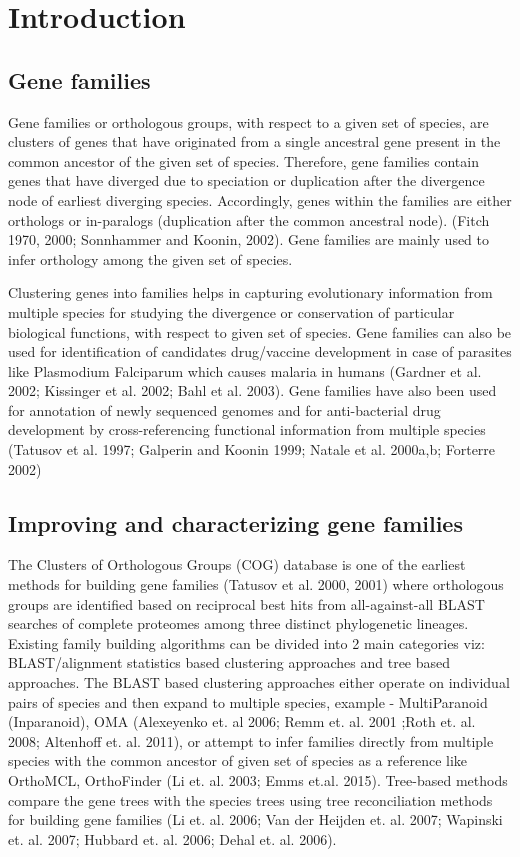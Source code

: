 \documentclass{article}
\begin{document}
	
	\section{Introduction}
		\subsection{Gene families}
		Gene families or orthologous groups, with respect to a given set of species, are clusters of genes that have originated from a single ancestral gene present in the common ancestor of the given set of species. Therefore, gene families contain genes that have diverged due to speciation or duplication after the divergence node of earliest diverging species. Accordingly, genes within the families are either orthologs or in-paralogs (duplication after the common ancestral node). (Fitch 1970, 2000; Sonnhammer and Koonin, 2002). Gene families are mainly used to infer orthology among the given set of species.
		
		Clustering genes into families helps in capturing evolutionary information from multiple species for studying the divergence or conservation of particular biological functions, with respect to given set of species. Gene families can also be used for identification of candidates drug/vaccine development in case of parasites like Plasmodium Falciparum which causes malaria in humans (Gardner et al. 2002; Kissinger et al. 2002; Bahl et al. 2003). Gene families have also been used for annotation of newly sequenced genomes and for anti-bacterial drug development by cross-referencing functional information from multiple species (Tatusov et al. 1997; Galperin and Koonin 1999; Natale et al. 2000a,b; Forterre 2002)
		
		\subsection{Improving and characterizing gene families}
		The Clusters of Orthologous Groups (COG) database is one of the earliest methods for building gene families (Tatusov et al. 2000, 2001) where orthologous groups are identified based on reciprocal best hits from all-against-all BLAST searches of complete proteomes among three distinct phylogenetic lineages. Existing family building algorithms can be divided into 2 main categories viz: BLAST/alignment statistics based clustering approaches and tree based approaches. The BLAST based clustering approaches either operate on individual pairs of species and then expand to multiple species, example - MultiParanoid (Inparanoid), OMA (Alexeyenko et. al 2006; Remm et. al. 2001 ;Roth et. al. 2008; Altenhoff et. al. 2011), or attempt to infer families directly from multiple species with the common ancestor of given set of species as a reference like  OrthoMCL, OrthoFinder (Li et. al. 2003; Emms et.al. 2015). Tree-based methods compare the gene trees with the species trees using tree reconciliation methods for building gene families (Li et. al. 2006; Van der Heijden et. al. 2007; Wapinski et. al. 2007; Hubbard et. al. 2006; Dehal et. al. 2006).
		  
\end{document}
